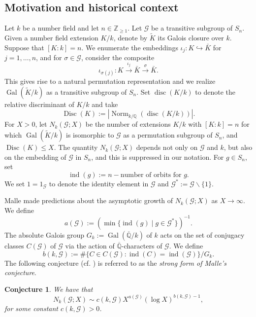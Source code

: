\documentclass[11pt]{amsart}
\newtheorem{conjecture}[theorem]{Conjecture}
\newcommand{\Z}{\mathbb{Z}}
\newcommand{\Q}{\mathbb{Q}}
\newcommand{\op}[1]{\operatorname{#1}}
\numberwithin{equation}{section}
\begin{document}
\subsection{Motivation and historical context}
\par Let $k$ be a number field and let $n\in \Z_{\geq 1}$. Let $\mathcal{G}$ be a transitive subgroup of $S_n$. Given a number field extension $K/k$, denote by $\widetilde{K}$ its Galois closure over $k$. Suppose that $[K:k]=n$. We enumerate the embeddings $\iota_j :K \hookrightarrow \bar{K}$ for $j=1, \dots, n$, and for $\sigma\in \mathcal{G}$, consider the composite \[\iota_{\sigma(j)}: K\xrightarrow{\iota_j} \bar{K}\xrightarrow{\sigma} \bar{K}.\]  This gives rise to a natural permutation representation and we realize $\op{Gal}(\widetilde{K}/k)$ as a transitive subgroup of $S_n$. Set $\op{disc}(K/k)$ to denote the relative discriminant of $K/k$ and take \[\op{Disc}(K):=| \op{Norm}_{k/\Q}(\op{disc}(K/k))|.\] For $X>0$, let $N_k(\mathcal{G}; X)$ be the number of extensions $K/k$ with $[K:k]=n$ for which $\op{Gal}(\widetilde{K}/k)$ is isomorphic to $\mathcal{G}$ as a permutation subgroup of $S_n$, and $\op{Disc}(K)\leq X$. The quantity $N_k(\mathcal{G}; X)$ depends not only on $\mathcal{G}$ and $k$, but also on the embedding of $\mathcal{G}$ in $S_n$, and this is suppressed in our notation. For $g\in S_n$, set \begin{equation}\label{index definition}
    \op{ind}(g):=n-\text{number of orbits for }g.
\end{equation} We set $1=1_{\mathcal{G}}$ to denote the identity element in $\mathcal{G}$ and $\mathcal{G}^\ast:=\mathcal{G}\backslash \{1\}$.
\par Malle made predictions about the asymptotic growth of $N_k(\mathcal{G};X)$ as $X\rightarrow \infty$. We define
$$a(\mathcal{G}):=\left(\op{min}\{\op{ind}(g)\mid g\in \mathcal{G}^\ast\}\right)^{-1}.$$
The absolute Galois group $G_k:=\op{Gal}(\overline{\Q}/k)$ of $k$ acts on the set of conjugacy classes $C(\mathcal{G})$ of $\mathcal{G}$ via the action of $\overline{\Q}$-characters of $\mathcal{G}$. We define
\[
b(k,\mathcal{G}):=\#\{C \in C(\mathcal{G}) : \op{ind}(C)=\op{ind}(\mathcal{G})\}/G_k.
\]
The following conjecture (cf. \cite[Conjecture 1.1]{malle2004distribution}) is referred to as the \emph{strong form of Malle's conjecture}.
\begin{conjecture}\label{malle's}
    We have that
    \[N_k(\mathcal{G};X)\sim c(k, \mathcal{G}) X^{a(\mathcal{G})}(\log X)^{b(k, \mathcal{G})-1},\]
    for some constant $c(k, \mathcal{G})>0$.
\end{conjecture}
\end{document}
